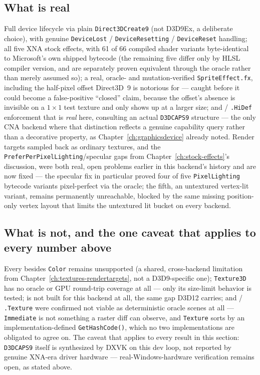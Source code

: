 \subsection{What is real}

Full device lifecycle via plain \texttt{Direct3DCreate9} (not D3D9Ex, a deliberate choice),
with genuine \texttt{DeviceLost} / \texttt{DeviceResetting} / \texttt{DeviceReset} handling; all
five XNA stock effects, with 61 of 66 compiled shader variants byte-identical to Microsoft's
own shipped bytecode (the remaining five differ only by HLSL compiler version, and are
separately proven equivalent through the oracle rather than merely assumed so); a real,
oracle- and mutation-verified \texttt{SpriteEffect.fx}, including the half-pixel offset
Direct3D~9 is notorious for --- caught before it could become a false-positive ``closed''
claim, because the offset's absence is invisible on a $1\times1$ test texture and only shows
up at a larger size; and  / \texttt{.HiDef} enforcement that is
\emph{real} here, consulting an actual \texttt{D3DCAPS9} structure --- the only CNA backend
where that distinction reflects a genuine capability query rather than a decorative property,
as Chapter~\ref{ch:graphicsdevice} already noted. Render targets sampled back as ordinary
textures, and the \texttt{PreferPerPixelLighting}/specular gaps from
Chapter~\ref{ch:stock-effects}'s  discussion, were both real, open
problems earlier in this backend's history and are now fixed --- the specular fix in
particular proved four of five \texttt{PixelLighting} bytecode variants pixel-perfect via the
oracle; the fifth, an untextured vertex-lit variant, remains permanently unreachable, blocked
by the same missing position-only vertex layout that limits the untextured lit bucket on
every backend.

\subsection{What is not, and the one caveat that applies to every number above}

Every  besides \texttt{Color} remains unsupported (a shared,
cross-backend limitation from Chapter~\ref{ch:textures-rendertargets}, not a D3D9-specific
one); \texttt{Texture3D} has no oracle or GPU round-trip coverage at all --- only its
 size-limit behavior is tested;  is not
built for this backend at all, the same gap D3D12 carries; and
 / \texttt{.Texture} were confirmed not viable as
deterministic oracle scenes at all --- \texttt{Immediate} is not something a raster diff can
observe, and \texttt{Texture} sorts by an implementation-defined \texttt{GetHashCode()},
which no two implementations are obligated to agree on. The caveat that applies to every
result in this section: \texttt{D3DCAPS9} itself is synthesized by DXVK on this dev loop, not
reported by genuine XNA-era driver hardware --- real-Windows-hardware verification remains
open, as stated above.

